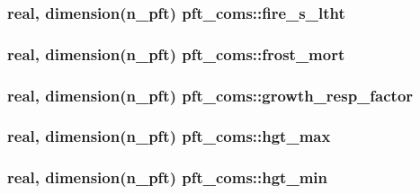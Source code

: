 \subsubsection[{fire\+\_\+s\+\_\+ltht}]{\setlength{\rightskip}{0pt plus 5cm}real, dimension(n\+\_\+pft) pft\+\_\+coms\+::fire\+\_\+s\+\_\+ltht}\label{namespacepft__coms_ac154348fc689309b47112ac66a6df99d}
\hypertarget{namespacepft__coms_a744036814ca3b450807de9613e918153}{}
\subsubsection[{frost\+\_\+mort}]{\setlength{\rightskip}{0pt plus 5cm}real, dimension(n\+\_\+pft) pft\+\_\+coms\+::frost\+\_\+mort}\label{namespacepft__coms_a744036814ca3b450807de9613e918153}
\hypertarget{namespacepft__coms_ae299a7616ce4a71415041f39e6e55d6c}{}
\subsubsection[{growth\+\_\+resp\+\_\+factor}]{\setlength{\rightskip}{0pt plus 5cm}real, dimension(n\+\_\+pft) pft\+\_\+coms\+::growth\+\_\+resp\+\_\+factor}\label{namespacepft__coms_ae299a7616ce4a71415041f39e6e55d6c}
\hypertarget{namespacepft__coms_a81703797d07f20bd129277ed6a78e30e}{}
\subsubsection[{hgt\+\_\+max}]{\setlength{\rightskip}{0pt plus 5cm}real, dimension(n\+\_\+pft) pft\+\_\+coms\+::hgt\+\_\+max}\label{namespacepft__coms_a81703797d07f20bd129277ed6a78e30e}
\hypertarget{namespacepft__coms_aab740dc3cca80fdd00440b412f111a74}{}
\subsubsection[{hgt\+\_\+min}]{\setlength{\rightskip}{0pt plus 5cm}real, dimension(n\+\_\+pft) pft\+\_\+coms\+::hgt\+\_\+min}\label{namespacepft__coms_aab740dc3cca80fdd00440b412f111a74}
\hypertarget{namespacepft__coms_a8cc0c7c9a26d749fd17c1ddc8633ea8a}{}
